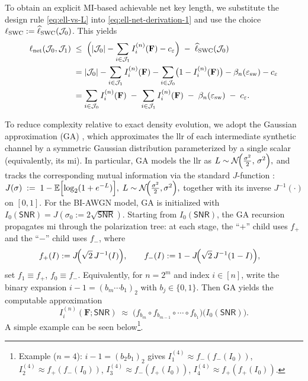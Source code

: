\documentclass[onecolumn]{IEEEtran} %
\newcommand{\bF}{\mathbf F}
\newcommand{\1}{\mathbbm{1}}
\theoremstyle{boldremark}
\begin{document}
To obtain an explicit MI-based achievable net key length, we substitute the
design rule \eqref{eq:ell-vs-L} into \eqref{eq:ell-net-derivation-1} and use the
choice $\ell_{\rm SWC}:=\widehat{\ell}_{\rm SWC}(\mathcal J_0)$. This yields
\begin{align}
\ell_{\rm net}(\mathcal J_0,\mathcal J_1)
\;&\le\;
\Bigl(|\mathcal J_0|-\sum_{i\in\mathcal J_1} I_i^{(n)}(\mathbf F)-c_{\varepsilon}\Bigr)
\;-\;
\widehat{\ell}_{\rm SWC}(\mathcal J_0)\notag\\
&=
|\mathcal J_0|
-\sum_{i\in\mathcal J_1} I_i^{(n)}(\mathbf F)
-\sum_{i\in\mathcal J_0}\bigl(1-I_i^{(n)}(\bF)\bigr)
-\beta_n(\varepsilon_{\rm sw})
-c_{\varepsilon}\notag\\
&=
\sum_{i\in\mathcal J_0} I_i^{(n)}(\bF)
\;-\;
\sum_{i\in\mathcal J_1} I_i^{(n)}(\mathbf F)
\;-\;
\beta_n(\varepsilon_{\rm sw})
\;-\;
c_{\varepsilon}.\label{eq:ell-net-lb-step}
\end{align}





To reduce complexity relative to exact density evolution, we adopt the Gaussian
approximation (GA) \cite{Trifonov2012EfficientPolarGA}, which approximates the \gls{llr} of each intermediate
synthetic channel by a symmetric Gaussian distribution parameterized by a
single scalar (equivalently, its \gls{mi}). In particular, GA models the \gls{llr} as
$  L \sim \mathcal{N}\!\Bigl(\tfrac{\sigma^2}{2},\,\sigma^2\Bigr),$
and tracks the corresponding mutual information via the standard $J$-function
\cite{Trifonov2012EfficientPolarGA}: $  J(\sigma)
  \;:=\;  1-\mathbb{E}\Bigl[\log_2(1+e^{-L})\Bigr],\;  L\sim\mathcal{N}\!\Bigl(\tfrac{\sigma^2}{2},\sigma^2\Bigr),$
together with its inverse $J^{-1}(\cdot)$ on $[0,1]$. For the BI-AWGN model, GA is
initialized with $I_0(\textsf{SNR})=J(\sigma_0:=2\sqrt{\textsf{SNR}})$. Starting from $I_0(\textsf{SNR})$,
the GA recursion propagates \gls{mi} through the polarization tree: at each stage,
the ``$+$'' child uses $f_{+}$ and the ``$-$'' child uses $f_{-}$, where
\begin{align}
  f_{+}(I) &:= J\!\Bigl(\sqrt{2}\,J^{-1}(I)\Bigr),\qquad
  f_{-}(I) := 1 - J\!\Bigl(\sqrt{2}\,J^{-1}(1-I)\Bigr),
\end{align}
set $f_{1}\equiv f_{+}$, $f_{0}\equiv f_{-}$.
Equivalently, for $n=2^{m}$ and index $i\in[n]$, write the binary expansion
$i-1=(b_m\cdots b_1)_2$ with $b_j\in\{0,1\}$. Then GA yields the computable approximation
\begin{equation}\label{eq:Ii-explicit-composition}
  I_i^{(n)}(\bF;\textsf{SNR})
  \;\approx\;
  \bigl(f_{b_{m}}\circ f_{b_{m-1}}\circ\cdots\circ f_{b_1}\bigr)
  \bigl(I_0(\textsf{SNR})\bigr).
\end{equation}
A simple example can be seen below\footnote{Example ($n=4$): $i-1=(b_2b_1)_2$ gives
$I_1^{(4)}\approx f_{-}(f_{-}(I_0))$,
$I_2^{(4)}\approx f_{+}(f_{-}(I_0))$,
$I_3^{(4)}\approx f_{-}(f_{+}(I_0))$,
$I_4^{(4)}\approx f_{+}(f_{+}(I_0))$.}.
\end{document}
